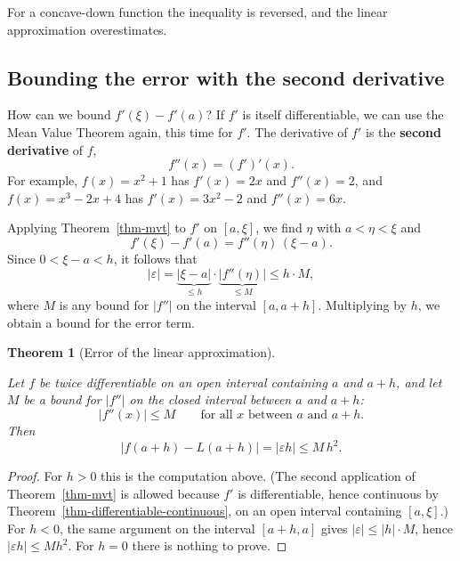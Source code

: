 \documentclass[
  letterpaper,
  DIV=11,
  numbers=noendperiod]{scrreprt}
\theoremstyle{plain}
\theoremstyle{plain}
\theoremstyle{definition}
\theoremstyle{definition}
\theoremstyle{definition}
\theoremstyle{plain}
\newtheorem{theorem}{Theorem}[chapter]
\theoremstyle{plain}
\theoremstyle{remark}
\begin{document}
For a concave-down function the inequality is reversed, and the linear
approximation overestimates.

\subsection{Bounding the error with the second
derivative}\label{bounding-the-error-with-the-second-derivative}

How can we bound \(f'(\xi) - f'(a)\)? If \(f'\) is itself
differentiable, we can use the Mean Value Theorem again, this time for
\(f'\). The derivative of \(f'\) is the \textbf{second derivative} of
\(f\), \[
f''(x) = (f')'(x) .
\] For example, \(f(x)=x^2+1\) has \(f'(x)=2x\) and \(f''(x)=2\), and
\(f(x)=x^3-2x+4\) has \(f'(x)=3x^2-2\) and \(f''(x) = 6x\).

Applying Theorem~\ref{thm-mvt} to \(f'\) on \([a,\xi]\), we find
\(\eta\) with \(a<\eta<\xi\) and \[
f'(\xi) - f'(a) = f''(\eta)\,(\xi - a) .
\] Since \(0<\xi-a<h\), it follows that \[
\lvert \varepsilon \rvert = \underbrace{\lvert \xi-a \rvert}_{\le h}\cdot\underbrace{\lvert f''(\eta) \rvert}_{\le M} \le h\cdot M ,
\] where \(M\) is any bound for \(\lvert f'' \rvert\) on the interval
\([a,a+h]\). Multiplying by \(h\), we obtain a bound for the error term.

\begin{theorem}[Error of the linear
approximation]\protect\hypertarget{thm-linear-approx-error}{}\label{thm-linear-approx-error}

Let \(f\) be twice differentiable on an open interval containing \(a\)
and \(a+h\), and let \(M\) be a bound for \(\lvert f'' \rvert\) on the
closed interval between \(a\) and \(a+h\): \[
\lvert f''(x) \rvert \le M \qquad\text{for all } x \text{ between } a \text{ and } a+h.
\] Then \[
\lvert f(a+h) - L(a+h) \rvert = \lvert \varepsilon h \rvert \le M\,h^2 .
\]

\end{theorem}

\begin{proof}
For \(h>0\) this is the computation above. (The second application of
Theorem~\ref{thm-mvt} is allowed because \(f'\) is differentiable, hence
continuous by Theorem~\ref{thm-differentiable-continuous}, on an open
interval containing \([a,\xi]\).) For \(h<0\), the same argument on the
interval \([a+h,a]\) gives
\(\lvert \varepsilon \rvert\le\lvert h \rvert\cdot M\), hence
\(\lvert \varepsilon h \rvert\le M h^2\). For \(h=0\) there is nothing
to prove.
\end{proof}
\end{document}

